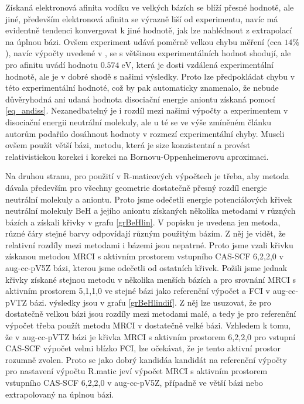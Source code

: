 Získaná elektronová afinita vodíku ve velkých bázích se blíží přesné 
hodnotě, ale jiné, především elektronová afinita se výrazně liší od 
experimentu, navíc má evidentně tendenci konvergovat k jiné hodnotě, jak lze nahlédnout 
z extrapolací na úplnou bázi. Ovšem experiment udává poměrně velkou chybu měření (cca $14\%$),
navíc výpočty uvedené v \cite{Koput_BeH, Koput_BeHan}, se s většinou experimentálních  
hodnot shodují, ale pro afinitu uvádí hodnotu $0.574\;\mathrm{eV}$, která je dosti 
vzdálená 
experimentální hodnotě, ale je v dobré shodě s našimi výsledky. Proto lze předpokládat 
chybu v této experimentální hodnoté, což by pak automaticky znamenalo, že nebude 
důvěryhodná ani udaná hodnota disociační energie aniontu získaná pomocí
\eqref{eq_andiss}. Nezanedbatelný je i rozdíl mezi našimi výpočty a experimentem v 
disociační energii neutrální molekuly, ale u té se ve výše zmíněném článku 
\cite{Koput_BeH} autorům podařilo dosáhnout hodnoty v rozmezí experimentální chyby.
Museli ovšem použít větší bázi,  
metodu, která je size konzistentní a provést relativistickou korekci i korekci na 
Bornovu-Oppenheimerovu aproximaci. 

Na druhou stranu, pro použití v R-maticových výpočtech je třeba, aby metoda dávala   
především pro všechny geometrie dostatečně přesný rozdíl energie neutrální molekuly a 
aniontu. Proto jsme odečetli energie potenciálových křivek neutrální molekuly BeH a jejího aniontu
získaných několika metodami v různých bázích a získali křivky v grafu \ref{grBeHlin}.
V popisku je uvedena jen metoda, různé čáry stejné barvy odpovídají různým použitým bázím.
Z něj je vidět, že relativní rozdíly mezi metodami i bázemi jsou nepatrné. Proto jsme
vzali křivku získanou metodou MRCI s aktivním prostorem vstupního CAS-SCF 6,2,2,0 v 
aug-cc-pV5Z bázi, kterou jsme odečetli od ostatních křivek. Požili jsme jednak křivky 
získané stejnou metodu v několika menších bázích a pro srovnání MRCI s aktivním 
prostorem 5,1,1,0 ve stejné bázi jako referenční výpočet a FCI v aug-cc-pVTZ bázi.
výsledky jsou v grafu \ref{grBeHlindif}. Z něj lze usuzovat, že pro dostatečně velkou 
bázi jsou rozdíly mezi metodami malé, a tedy je pro referenční výpočet třeba 
použít metodu MRCI v dostatečně velké bázi. Vzhledem k tomu, že v aug-cc-pVTZ bázi je 
křivka MRCI s aktivním prostorem 6,2,2,0 pro vstupní CAS-SCF výpočet velmi blízko FCI, 
lze očekávat, že je tento aktivní prostor rozumně zvolen. Proto se jako dobrý kandidáa 
kandidát na referenční výpočty pro nastavení výpočtu R.matic jeví výpočet MRCI s aktivním 
prostorem vstupního CAS-SCF 6,2,2,0 v aug-cc-pV5Z, případně ve větší bázi nebo 
extrapolovaný na úplnou bázi.

